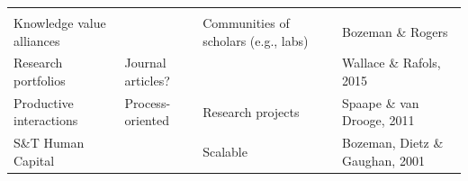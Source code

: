 \documentclass[]{elsarticle} %
\begin{document}
\begin{longtable}[]{@{}llll@{}}
\begin{minipage}[t]{0.16\columnwidth}
\strut
\end{minipage}\tabularnewline
\begin{minipage}[t]{0.24\columnwidth}\raggedright
Knowledge value alliances\strut
\end{minipage} & \begin{minipage}[t]{0.23\columnwidth}\raggedright
\strut
\end{minipage} & \begin{minipage}[t]{0.25\columnwidth}\raggedright
Communities of scholars (e.g., labs)\strut
\end{minipage} & \begin{minipage}[t]{0.16\columnwidth}\raggedright
Bozeman \& Rogers\strut
\end{minipage}\tabularnewline
\begin{minipage}[t]{0.24\columnwidth}\raggedright
Research portfolios\strut
\end{minipage} & \begin{minipage}[t]{0.23\columnwidth}\raggedright
Journal articles?\strut
\end{minipage} & \begin{minipage}[t]{0.25\columnwidth}\raggedright
\strut
\end{minipage} & \begin{minipage}[t]{0.16\columnwidth}\raggedright
Wallace \& Rafols, 2015\strut
\end{minipage}\tabularnewline
\begin{minipage}[t]{0.24\columnwidth}\raggedright
Productive interactions\strut
\end{minipage} & \begin{minipage}[t]{0.23\columnwidth}\raggedright
Process-oriented\strut
\end{minipage} & \begin{minipage}[t]{0.25\columnwidth}\raggedright
Research projects\strut
\end{minipage} & \begin{minipage}[t]{0.16\columnwidth}\raggedright
Spaape \& van Drooge, 2011\strut
\end{minipage}\tabularnewline
\begin{minipage}[t]{0.24\columnwidth}\raggedright
S\&T Human Capital\strut
\end{minipage} & \begin{minipage}[t]{0.23\columnwidth}\raggedright
\strut
\end{minipage} & \begin{minipage}[t]{0.25\columnwidth}\raggedright
Scalable\strut
\end{minipage} & \begin{minipage}[t]{0.16\columnwidth}\raggedright
Bozeman, Dietz \& Gaughan, 2001\strut
\end{minipage}\tabularnewline
\bottomrule
\end{longtable}
\end{document}
